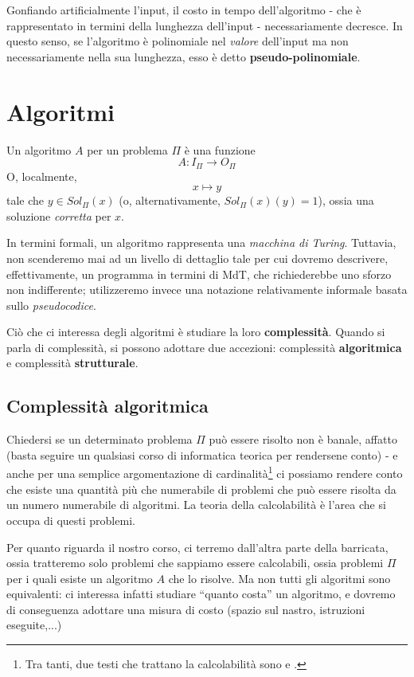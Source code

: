 Gonfiando artificialmente l'input, il costo in tempo dell'algoritmo - che è
rappresentato in termini della lunghezza dell'input - necessariamente decresce.
In questo senso, se l'algoritmo è polinomiale nel \textit{valore} dell'input
ma non necessariamente nella sua lunghezza, esso è detto \textbf{pseudo-polinomiale}.

\section {Algoritmi}
Un algoritmo $A$ per un problema $\Pi$ è una funzione
$$
	A: I_{\Pi} \rightarrow O_{\Pi}
$$
O, localmente,
$$
	x \mapsto y
$$
tale che  $y \in Sol_{\Pi}(x)$ (o, alternativamente, $Sol_{\Pi}(x)(y) = 1$),
ossia una soluzione \textit{corretta} per $x$.

In termini formali, un algoritmo rappresenta una \textit{macchina di Turing}.
Tuttavia, non scenderemo mai ad un livello di dettaglio tale per cui dovremo descrivere,
effettivamente, un programma in termini di MdT, che richiederebbe uno sforzo
non indifferente; utilizzeremo invece una notazione relativamente informale
basata sullo \textit{pseudocodice}.

Ciò che ci interessa degli algoritmi è studiare la loro \textbf{complessità}.
Quando si parla di complessità, si possono adottare due accezioni:
complessità \textbf{algoritmica} e complessità \textbf{strutturale}.

\subsection{Complessità algoritmica}
Chiedersi se un determinato problema $\Pi$ può essere risolto
non è banale, affatto (basta seguire un qualsiasi corso di informatica teorica
per rendersene conto) - e anche per una semplice argomentazione di cardinalità\footnote{
	Tra tanti, due testi che trattano la calcolabilità sono \cite{Hopcroft:79:introLFA} e
	\cite{Kfoury:82:programcomput}.
}
ci possiamo rendere conto che esiste una quantità più che numerabile di problemi
che può essere risolta da un numero numerabile di algoritmi. La teoria della
calcolabilità è l'area che si occupa di questi problemi.

Per quanto riguarda il nostro corso, ci terremo dall'altra parte della barricata,
ossia tratteremo solo problemi che sappiamo essere calcolabili, ossia problemi
$\Pi$ per i quali esiste un algoritmo $A$ che lo risolve.
Ma non tutti gli algoritmi sono equivalenti: ci interessa
infatti studiare ``quanto costa'' un algoritmo, e dovremo di conseguenza
adottare una misura di costo (spazio sul nastro, istruzioni eseguite,...)

